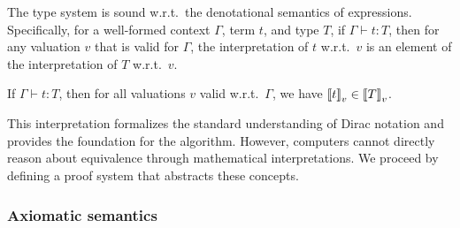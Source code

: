 
The type system is sound w.r.t.\, the denotational semantics of
expressions. Specifically, for a well-formed context \( \Gamma \), term \( t \), and type \( T \), if \( \Gamma \vdash t : T \), then for any valuation \( v \) that is valid for $\Gamma$, the interpretation of \( t \)  w.r.t.\, $v$ is an element of the interpretation of \( T \) w.r.t.\, $v$.

\begin{lemma}
  \label{lemma:sound type system}
  If \( \Gamma \vdash t : T \), then for all valuations \( v \) valid w.r.t.\,
  $\Gamma$, we have \( {\llbracket t \rrbracket}_v \in {\llbracket T \rrbracket}_v \).
\end{lemma}
This interpretation formalizes the standard understanding of Dirac
notation and provides the foundation for the algorithm. However,
computers cannot directly reason about equivalence through
mathematical interpretations. We proceed by defining a proof system
that abstracts these concepts.



\subsubsection{Axiomatic semantics} 

